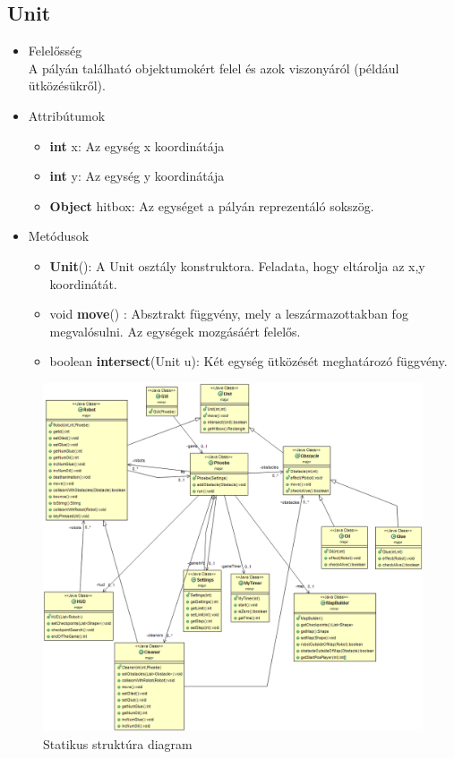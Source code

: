 \subsection{Unit}
\begin{itemize}
\item Felelősség\\
A pályán található objektumokért felel és azok viszonyáról (például ütközésükről).
\item Attribútumok
	\begin{itemize}
		\item \textbf{int} x: Az egység x koordinátája
		\item \textbf{int} y: Az egység y koordinátája
		\item \textbf{Object} hitbox: Az egységet a pályán reprezentáló sokszög.
	\end{itemize}
\item Metódusok
	\begin{itemize}
	    \item \textbf{Unit}(): A Unit osztály konstruktora. Feladata, hogy eltárolja az x,y koordinátát.
		\item void \textbf{move}() : Absztrakt függvény, mely a leszármazottakban fog megvalósulni. Az egységek mozgásáért felelős.
		\item boolean \textbf{intersect}(Unit u): Két egység ütközését meghatározó függvény.
	\end{itemize}
\end{itemize}

\begin{figure}[h]
\begin{center}
\includegraphics[width=17cm]{images/struktdiagram.PNG}
\caption{Statikus struktúra diagram}
\label{fig:example3}
\end{center}
\end{figure}
\pagebreak

